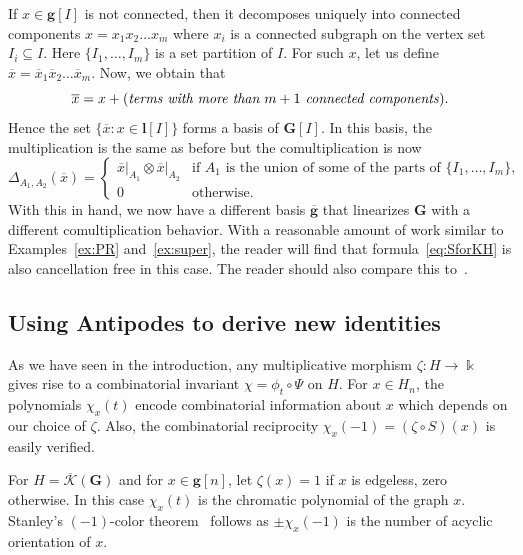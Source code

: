 \documentclass[ALCO,ThmDefs,Unicode,epreuves]{cedram}
\def\field{\Bbbk}
\newcommand{\Kc}{\mathcal{K}}
\newcommand{\Kcb}{\overline{\Kc}}
\begin{document}
\begin{exam}
 If $x\in \mathbf{g}[I]$ is not connected, then it decomposes uniquely into connected components $x=x_1x_2\ldots x_m$ where $x_i$ is a connected subgraph on the vertex set $I_i\subseteq I$.
 Here $\{I_1,\ldots,I_m\}$ is a set partition of $I$. For such $x$, let us define $\overline{x}=\overline{x}_1\overline{x}_2\ldots\overline{x}_m$.
 Now, we obtain that
 $$\overline{x}=x+(\text{\emph{terms with more than $m+1$ connected components}}).$$ 
 Hence the set $\{\overline{x}:x\in\mathbf{l}[I]\}$ forms a basis of $\mathbf{G}[I]$. In this basis, the multiplication is the same as before but the comultiplication is now
 $$
 \Delta_{A_1,A_2}(\overline{x}) = 
\begin{cases}
{\overline{x}|_{A_1}} \otimes {\overline{x}|_{A_2}} & \text{if $A_1$ is the union of some of the parts of $\{I_1,\ldots,I_m\}$,} \\
0 & \text{otherwise.}
\end{cases}
$$
With this in hand, we now have a different basis $\overline{\mathbf{g}}$ that linearizes $\mathbf{G}$ with a different comultiplication behavior.
With a reasonable amount of work similar to Examples~\ref{ex:PR} and~\ref{ex:super}, the reader will find that formula~\eqref{eq:SforKH} is also cancellation free in this case. The reader should also compare this to~\cite[Theorem~4.7]{MarbergLin}.
\end{exam}
\subsection{Using Antipodes to derive new identities}\label{ss:antiStan} As we have seen in the introduction, any multiplicative morphism $\zeta\colon H\to\field$
gives rise to a combinatorial invariant $\chi=\phi_t\circ \Psi$ on $H$. For $x\in H_n$, the polynomials $\chi_x(t)$ encode combinatorial information about $x$ which depends on our choice of $\zeta$. 
Also, the combinatorial reciprocity $\chi_x(-1)=(\zeta\circ S)(x)$ is easily verified. 
\begin{exam} For $H=\Kcb({\mathbf{G}})$ and for $x\in\mathbf{g}[n]$, let $\zeta(x)=1$ if $x$ is edgeless, zero otherwise. In this case $\chi_x(t)$ is the chromatic polynomial of the graph $x$. Stanley's $(-1)$-color theorem~\cite{stanley} follows as
 $\pm \chi_x(-1)$ is the number of acyclic orientation of $x$.
\end{exam}
\end{document}
